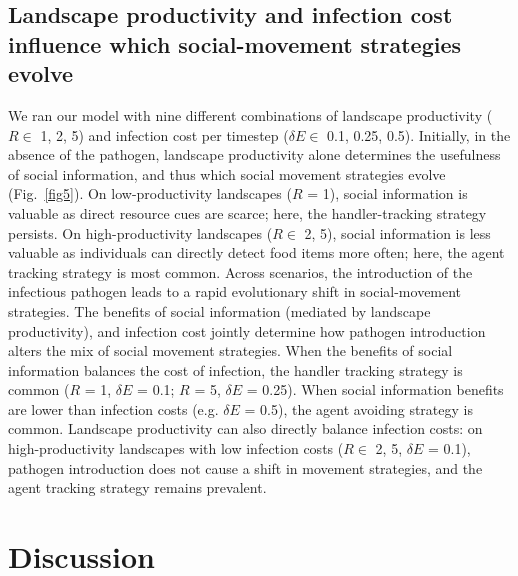 \subsection*{Landscape productivity and infection cost influence which social-movement strategies evolve}

We ran our model with nine different combinations of landscape productivity ($R \in $ 1, 2, 5) and infection cost per timestep ($\delta E \in$ 0.1, 0.25, 0.5).
Initially, in the absence of the pathogen, landscape productivity alone determines the usefulness of social information, and thus which social movement strategies evolve (Fig.~\ref{fig5}).
On low-productivity landscapes ($R$ = 1), social information is valuable as direct resource cues are scarce; here, the handler-tracking strategy persists.
On high-productivity landscapes ($R \in$ 2, 5), social information is less valuable as individuals can directly detect food items more often; here, the agent tracking strategy is most common.
Across scenarios, the introduction of the infectious pathogen leads to a rapid evolutionary shift in social-movement strategies.
The benefits of social information (mediated by landscape productivity), and infection cost jointly determine how pathogen introduction alters the mix of social movement strategies.
When the benefits of social information balances the cost of infection, the handler tracking strategy is common ($R$ = 1, $\delta E$ = 0.1; $R$ = 5, $\delta E$ = 0.25).
When social information benefits are lower than infection costs (e.g. $\delta E$ = 0.5), the agent avoiding strategy is common.
Landscape productivity can also directly balance infection costs: on high-productivity landscapes with low infection costs ($R \in$ 2, 5, $\delta E$ = 0.1), pathogen introduction does not cause a shift in movement strategies, and the agent tracking strategy remains prevalent.

\section*{Discussion}

